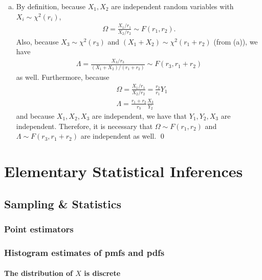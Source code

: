 \documentclass{book}
\theoremstyle{definition}
\newcommand{\f}[2]{\frac{#1}{#2}}
\begin{document}
\begin{enumerate}[(a)]
	
	
	
	
	\item By definition, because $X_1, X_2$ are independent random variables with $X_i \sim \chi^2(r_i)$, 
	\begin{align}
	\Omega = \f{X_1/r_1}{X_2/r_2} \sim F(r_1, r_2).
	\end{align}
	Also, because $X_3 \sim \chi^2(r_3)$ and $(X_1 + X_2) \sim \chi^2(r_1 + r_2)$ (from (a)), we have
	\begin{align}
	\Lambda = \f{X_3/r_3}{(X_1 + X_2)/(r_1 + r_2)} \sim F(r_3, r_1 + r_2)
	\end{align}
	as well. Furthermore, because 
	\begin{align}
	&\Omega = \f{X_1/r_1}{X_2/r_2} = \f{r_2}{r_1}Y_1\\
	&\Lambda = \f{r_1+r_2}{r_3}\f{X_3}{Y_2}
	\end{align}
	and because $X_1, X_2, X_3$ are independent, we have that $Y_1, Y_2, X_3$ are independent. Therefore, it is necessary that $\Omega \sim F(r_1, r_2)$ and $\Lambda \sim F(r_3, r_1 + r_2)$ are independent as well. \qed
	
\end{enumerate}












\chapter{Elementary Statistical Inferences}
\newpage

\section{Sampling \& Statistics}

\subsection{Point estimators}
\subsection{Histogram estimates of pmfs and pdfs}
\subsubsection{The distribution of $X$ is discrete}
\end{document}
